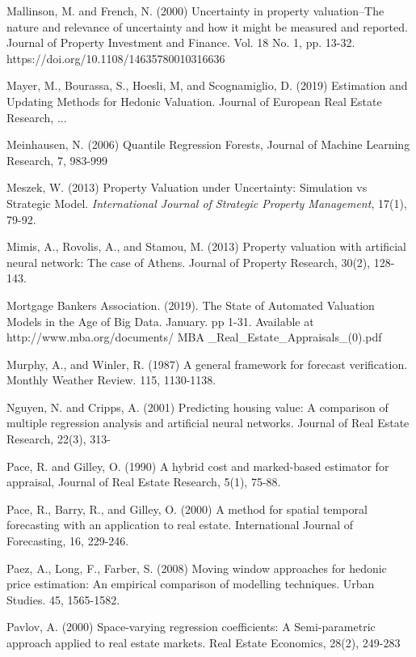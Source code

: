 \documentclass[colTwo]{format}
\theoremstyle{definition}
\begin{document}
\begin{thebibliography}{50}
\harvarditem{}{}{}Mallinson, M. and French, N. (2000) Uncertainty in property valuation--The nature and relevance of uncertainty and how it might be measured and reported. Journal of Property Investment and Finance. Vol. 18 No. 1, pp. 13-32. https://doi.org/10.1108/14635780010316636

\harvarditem{}{}{}Mayer, M., Bourassa, S., Hoesli, M, and Scognamiglio, D. (2019) Estimation and Updating Methods for Hedonic Valuation. Journal of European Real Estate Research, ...

\harvarditem{}{}{}Meinhausen, N.  (2006) Quantile Regression Forests, Journal of Machine Learning Research, 7, 983-999

\harvarditem{}{}{}Meszek, W. (2013) Property Valuation under Uncertainty: Simulation vs Strategic Model. \textit{International Journal of Strategic Property Management}, 17(1), 79-92. 

\harvarditem{}{}{}Mimis, A., Rovolis, A., and Stamou, M. (2013) Property valuation with artificial neural network: The case of Athens. Journal of Property Research, 30(2), 128-143. 

\harvarditem{}{}{}Mortgage Bankers Association. (2019). The State of Automated Valuation Models in the Age of Big Data. January. pp 1-31. Available at http://www.mba.org/documents/ MBA \_Real\_Estate\_Appraisals\_(0).pdf

\harvarditem{}{}{}Murphy, A., and Winler, R. (1987) A general framework for forecast verification. Monthly Weather Review. 115, 1130-1138.

\harvarditem{}{}{}Nguyen, N. and Cripps, A. (2001) Predicting housing value: A comparison of multiple regression analysis and artificial neural networks. Journal of Real Estate Research, 22(3), 313-

\harvarditem{}{}{}Pace, R. and Gilley, O. (1990) A hybrid cost and marked-based estimator for appraisal, Journal of Real Estate Research, 5(1), 75-88. 

\harvarditem{}{}{}Pace, R., Barry, R., and Gilley, O. (2000) A method for spatial temporal forecasting with an application to real estate.  International Journal of Forecasting, 16, 229-246. 

\harvarditem{}{}{}Paez, A., Long, F., Farber, S. (2008) Moving window approaches for hedonic price estimation: An empirical comparison of modelling techniques. Urban Studies. 45, 1565-1582. 

\harvarditem{}{}{}Pavlov, A. (2000) Space-varying regression coefficients: A Semi-parametric approach applied to real estate markets. Real Estate Economics, 28(2), 249-283


\end{thebibliography}
\end{document}
